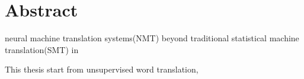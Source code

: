 \chapter{Abstract}
neural machine translation systems(NMT) beyond traditional statistical machine translation(SMT) in

This thesis start from unsupervised word translation,  